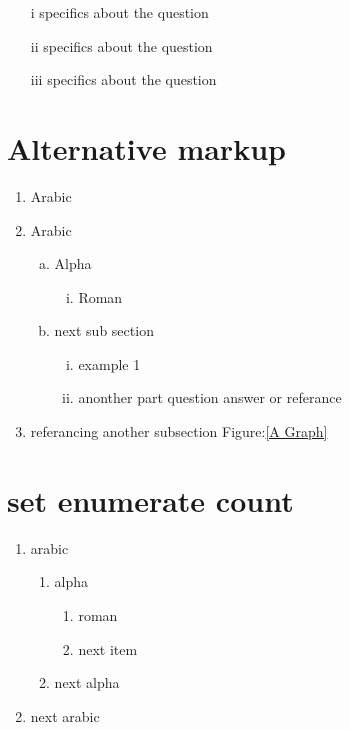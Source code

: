 \documentclass[fleqn]{report}
\begin{document}
\begin{itemize}
\item[i] specifics about the question
\item[ii] specifics about the question
\item[iii] specifics about the question
\end{itemize}
\clearpage

\section{Alternative markup} %

\begin{enumerate}
	\item Arabic
	\item Arabic
	\begin{enumerate}[(a)]%
		\item Alpha
			\begin{enumerate}[(i)]
				\item Roman
			\end{enumerate}
		\item next sub section
			\begin{enumerate}[(i)]
				\item example 1
				\item anonther part question answer or referance
			\end{enumerate}	
	\end{enumerate}
	\item referancing another subsection Figure:\ref{A Graph}
\end{enumerate}

\section{set enumerate count}
\begin{enumerate}[4] %
	\item arabic
	\begin{enumerate}
		\item alpha
			\begin{enumerate}
				\item roman
				\item next item
			\end{enumerate}
		\item next alpha			
	\end{enumerate}
	\item next arabic
\end{enumerate}
\end{document}
